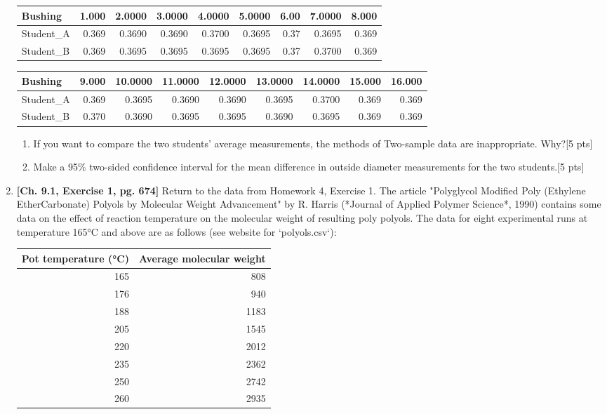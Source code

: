 \documentclass[11pt]{article}\usepackage[]{graphicx}\usepackage[]{color}
\begin{document}
\begin{enumerate}
\begin{tabular}{l|r|r|r|r|r|r|r|r}
\centering
\hline
Bushing & 1.000 & 2.0000 & 3.0000 & 4.0000 & 5.0000 & 6.00 & 7.0000 & 8.000\\
\hline
Student\_A & 0.369 & 0.3690 & 0.3690 & 0.3700 & 0.3695 & 0.37 & 0.3695 & 0.369\\
\hline
Student\_B & 0.369 & 0.3695 & 0.3695 & 0.3695 & 0.3695 & 0.37 & 0.3700 & 0.369\\
\hline
\end{tabular}

\begin{tabular}{l|r|r|r|r|r|r|r|r}
\centering
\hline
Bushing & 9.000 & 10.0000 & 11.0000 & 12.0000 & 13.0000 & 14.0000 & 15.000 & 16.000\\
\hline
Student\_A & 0.369 & 0.3695 & 0.3690 & 0.3690 & 0.3695 & 0.3700 & 0.369 & 0.369\\
\hline
Student\_B & 0.370 & 0.3690 & 0.3695 & 0.3695 & 0.3690 & 0.3695 & 0.369 & 0.369\\
\hline
\end{tabular}

\begin{enumerate}
\item If you want to compare the two students' average measurements, the methods of Two-sample data are inappropriate. Why?[5 pts]
    
\item Make a 95\% two-sided confidence interval for the mean difference in outside diameter measurements for the two students.[5 pts]
    
\end{enumerate}

\item \textbf{[Ch. 9.1, Exercise 1, pg. 674] }Return to the data from Homework 4, Exercise 1. The article "Polyglycol Modified Poly (Ethylene EtherCarbonate) Polyols by Molecular Weight Advancement" by R. Harris (*Journal of Applied Polymer Science*, 1990) contains some data on the effect of reaction temperature on the molecular weight of resulting poly polyols. The data for eight experimental runs at temperature 165°C and above are as follows (see website for `polyols.csv`):

\begin{centering}
\begin{tabular}{r|r}

\hline
Pot temperature (°C) & Average molecular weight\\
\hline
165 & 808\\
\hline
176 & 940\\
\hline
188 & 1183\\
\hline
205 & 1545\\
\hline
220 & 2012\\
\hline
235 & 2362\\
\hline
250 & 2742\\
\hline
260 & 2935\\
\hline
\end{tabular}


\end{centering}
\end{enumerate}
\end{document}
